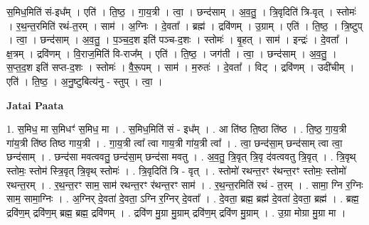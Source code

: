 \documentclass[17pt]{extarticle}
\begin{document}
स॒मिध॒मिति॑ सं-इध᳚म् । एति॑ । ति॒ष्ठ॒ । गा॒य॒त्री । त्वा॒ । छन्द॑साम् । अ॒व॒तु॒ । त्रि॒वृदिति॑ त्रि-वृत् । स्तोमः॑ । र॒थ॒न्त॒रमिति॑ रथं-त॒रम् । साम॑ । अ॒ग्निः । दे॒वता᳚ । ब्रह्म॑ । द्रवि॑णम् । उ॒ग्राम् । एति॑ । ति॒ष्ठ॒ । त्रि॒ष्टुप् । त्वा॒ । छन्द॑साम् । अ॒व॒तु॒ । प॒ञ्च॒द॒श इति॑ पञ्च-द॒शः । स्तोमः॑ । बृ॒हत् । साम॑ । इन्द्रः॑ । दे॒वता᳚ । क्ष॒त्रम् । द्रवि॑णम् । वि॒राज॒मिति॑ वि-राज᳚म् । एति॑ । ति॒ष्ठ॒ । जग॑ती । त्वा॒ । छन्द॑साम् । अ॒व॒तु॒ । स॒प्त॒द॒श इति॑ सप्त-द॒शः । स्तोमः॑ । वै॒रू॒पम् । साम॑ । म॒रुतः॑ । दे॒वता᳚ । विट् । द्रवि॑णम् । उदी॑चीम् । एति॑ । ति॒ष्ठ॒ । अ॒नु॒ष्टुबित्य॑नु - स्तुप् । त्वा॒ ।  \newline



\textbf{Jatai Paata} \newline

1. स॒मिध॒ मा स॒मिधꣳ॑ स॒मिध॒ मा । . स॒मिध॒मिति॑ सं - इध᳚म् । . आ ति॑ष्ठ ति॒ष्ठा ति॑ष्ठ । . ति॒ष्ठ॒ गा॒य॒त्री गा॑य॒त्री ति॑ष्ठ तिष्ठ गाय॒त्री । . गा॒य॒त्री त्वा᳚ त्वा गाय॒त्री गा॑य॒त्री त्वा᳚ । . त्वा॒ छन्द॑सा॒म् छन्द॑साम् त्वा त्वा॒ छन्द॑साम् । . छन्द॑सा मवत्ववतु॒ छन्द॑सा॒म् छन्द॑सा मवतु । . अ॒व॒तु॒ त्रि॒वृत् त्रि॒वृ द॑वत्ववतु त्रि॒वृत् । . त्रि॒वृथ् स्तोमः॒ स्तोम॑ स्त्रि॒वृत् त्रि॒वृथ् स्तोमः॑ । . त्रि॒वृदिति॑ त्रि - वृत् । . स्तोमो॑ रथन्त॒रꣳ र॑थन्त॒रꣳ स्तोमः॒ स्तोमो॑ रथन्त॒रम् । . र॒थ॒न्त॒रꣳ साम॒ साम॑ रथन्त॒रꣳ र॑थन्त॒रꣳ साम॑ । . र॒थ॒न्त॒रमिति॑ रथं - त॒रम् । . सामा॒ ग्नि र॒ग्निः साम॒ सामा॒ग्निः । . अ॒ग्निर् दे॒वता॑ दे॒वता॒ ऽग्नि र॒ग्निर् दे॒वता᳚ । . दे॒वता॒ ब्रह्म॒ ब्रह्म॑ दे॒वता॑ दे॒वता॒ ब्रह्म॑ । . ब्रह्म॒ द्रवि॑ण॒म् द्रवि॑ण॒म् ब्रह्म॒ ब्रह्म॒ द्रवि॑णम् । . द्रवि॑ण मु॒ग्रा मु॒ग्राम् द्रवि॑ण॒म् द्रवि॑ण मु॒ग्राम् । . उ॒ग्रा मोग्रा मु॒ग्रा मा । \newline
\end{document}
